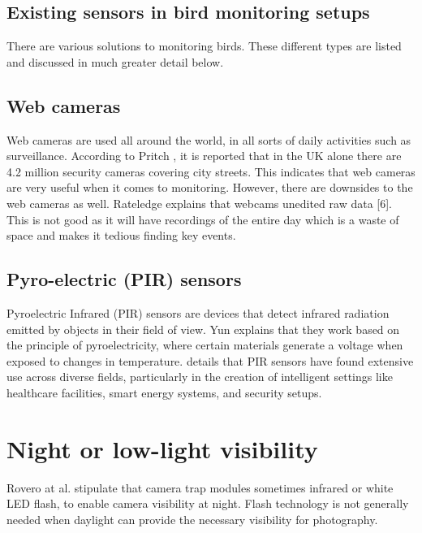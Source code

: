 \documentclass[class=report,11pt,crop=false]{standalone}
\begin{document}
\subsection{Existing sensors in bird monitoring setups}

There are various solutions to monitoring birds. These different types are listed and discussed in much greater detail below.

\subsection{Web cameras}

Web cameras are used all around the world, in all sorts of daily activities such as surveillance. According to Pritch \cite{pritch2007webcam}, it is reported that in the UK alone there are 4.2 million security cameras covering city streets. This indicates that web cameras are very useful when it comes to monitoring. However, there are downsides to the web cameras as well. Rateledge \cite{ratledge2005introduction} explains that webcams unedited raw data [6]. This is not good as it will have recordings of the entire day which is a waste of space and makes it tedious finding key events.

\subsection{Pyro-electric (PIR) sensors}

Pyroelectric Infrared (PIR) sensors are devices that detect infrared radiation emitted by objects in their field of view. Yun \cite{yun2014detecting} explains that they work based on the principle of pyroelectricity, where certain materials generate a voltage when exposed to changes in temperature. \cite{amusa2015pyro} details that PIR sensors have found extensive use across diverse fields, particularly in the creation of intelligent settings like healthcare facilities, smart energy systems, and security setups.


\section{Night or low-light visibility}

Rovero at al. \cite{rovero2013which} stipulate that camera trap modules sometimes infrared or white LED flash, to enable camera visibility at night. Flash technology is not generally needed when daylight can provide the necessary visibility for photography.
\end{document}
